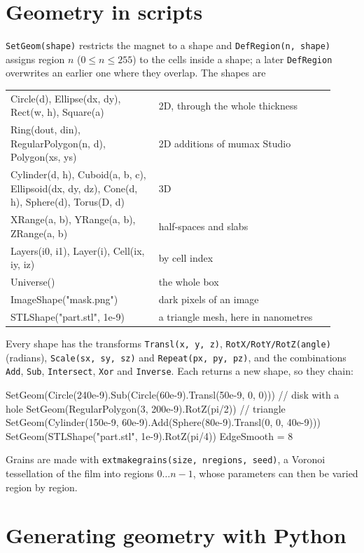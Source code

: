 \documentclass[11pt,a4paper,oneside]{book}
\newcommand{\code}[1]{\texttt{#1}}
\renewcommand{\_}{\textunderscore\allowbreak}
\begin{document}
\section{Geometry in scripts}\label{sec:geommx3}

\code{SetGeom(shape)} restricts the magnet to a shape and \code{DefRegion(n, shape)} assigns region $n$
($0\le n\le255$) to the cells inside a shape; a later \code{DefRegion} overwrites an earlier one where they
overlap. The shapes are
\begin{center}
\small
\begin{tabular}{>{\ttfamily\raggedright}p{0.42\linewidth} p{0.5\linewidth}}
\toprule
Circle(d), Ellipse(dx, dy), Rect(w, h), Square(a) & 2D, through the whole thickness \\
Ring(dout, din), RegularPolygon(n, d), Polygon(xs, ys) & 2D additions of mumax Studio \\
Cylinder(d, h), Cuboid(a, b, c), Ellipsoid(dx, dy, dz), Cone(d, h), Sphere(d), Torus(D, d) & 3D \\
XRange(a, b), YRange(a, b), ZRange(a, b) & half-spaces and slabs \\
Layers(i0, i1), Layer(i), Cell(ix, iy, iz) & by cell index \\
Universe() & the whole box \\
ImageShape("mask.png") & dark pixels of an image \\
STLShape("part.stl", 1e-9) & a triangle mesh, here in nanometres \\
\bottomrule
\end{tabular}
\end{center}
Every shape has the transforms \code{Transl(x, y, z)}, \code{RotX/RotY/RotZ(angle)} (radians),
\code{Scale(sx, sy, sz)} and \code{Repeat(px, py, pz)}, and the combinations \code{Add}, \code{Sub},
\code{Intersect}, \code{Xor} and \code{Inverse}. Each returns a new shape, so they chain:
\begin{mxcode}
SetGeom(Circle(240e-9).Sub(Circle(60e-9).Transl(50e-9, 0, 0)))    // disk with a hole
SetGeom(RegularPolygon(3, 200e-9).RotZ(pi/2))                      // triangle
SetGeom(Cylinder(150e-9, 60e-9).Add(Sphere(80e-9).Transl(0, 0, 40e-9)))
SetGeom(STLShape("part.stl", 1e-9).RotZ(pi/4))
EdgeSmooth = 8
\end{mxcode}
Grains are made with \code{ext\_makegrains(size, nregions, seed)}, a Voronoi tessellation of the film into
regions $0\ldots n-1$, whose parameters can then be varied region by region.

\section{Generating geometry with Python}\label{sec:geompy}
\end{document}

